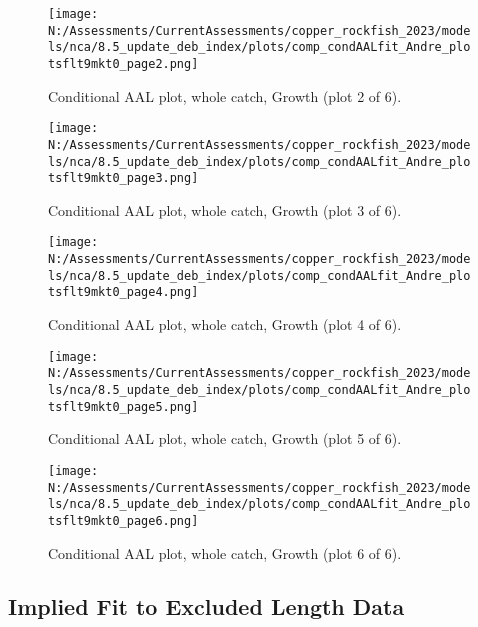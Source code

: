 \documentclass[11pt,
  english,
  letterpaper,
]{article}
\begin{document}
\begin{figure}
\centering
\texttt{[image: N:/Assessments/CurrentAssessments/copper\_rockfish\_2023/models/nca/8.5\_update\_deb\_index/plots/comp\_condAALfit\_Andre\_plotsflt9mkt0\_page2.png]}
\caption{Conditional AAL plot, whole catch, Growth (plot 2 of 6).\label{fig:comp_condAALfit_Andre_plotsflt9mkt0_page2}}
\end{figure}

\begin{figure}
\centering
\texttt{[image: N:/Assessments/CurrentAssessments/copper\_rockfish\_2023/models/nca/8.5\_update\_deb\_index/plots/comp\_condAALfit\_Andre\_plotsflt9mkt0\_page3.png]}
\caption{Conditional AAL plot, whole catch, Growth (plot 3 of 6).\label{fig:comp_condAALfit_Andre_plotsflt9mkt0_page3}}
\end{figure}

\begin{figure}
\centering
\texttt{[image: N:/Assessments/CurrentAssessments/copper\_rockfish\_2023/models/nca/8.5\_update\_deb\_index/plots/comp\_condAALfit\_Andre\_plotsflt9mkt0\_page4.png]}
\caption{Conditional AAL plot, whole catch, Growth (plot 4 of 6).\label{fig:comp_condAALfit_Andre_plotsflt9mkt0_page4}}
\end{figure}

\begin{figure}
\centering
\texttt{[image: N:/Assessments/CurrentAssessments/copper\_rockfish\_2023/models/nca/8.5\_update\_deb\_index/plots/comp\_condAALfit\_Andre\_plotsflt9mkt0\_page5.png]}
\caption{Conditional AAL plot, whole catch, Growth (plot 5 of 6).\label{fig:comp_condAALfit_Andre_plotsflt9mkt0_page5}}
\end{figure}

\begin{figure}
\centering
\texttt{[image: N:/Assessments/CurrentAssessments/copper\_rockfish\_2023/models/nca/8.5\_update\_deb\_index/plots/comp\_condAALfit\_Andre\_plotsflt9mkt0\_page6.png]}
\caption{Conditional AAL plot, whole catch, Growth (plot 6 of 6).\label{fig:comp_condAALfit_Andre_plotsflt9mkt0_page6}}
\end{figure}

\hypertarget{excluded-data}{%
\subsection{Implied Fit to Excluded Length Data}\label{excluded-data}}
\end{document}
